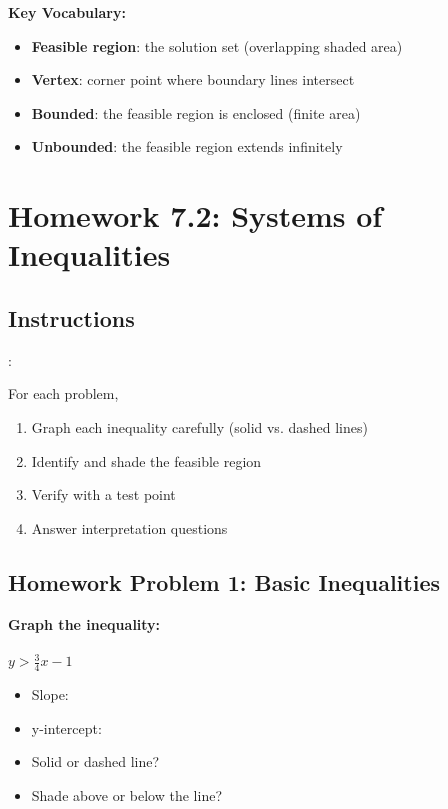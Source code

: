 \documentclass[12pt]{article}
\begin{document}
	        \textbf{Key Vocabulary:}
	        \begin{itemize}
		        \item \textbf{Feasible region}: the solution set (overlapping shaded area)
		        \item \textbf{Vertex}: corner point where boundary lines intersect
		        \item \textbf{Bounded}: the feasible region is enclosed (finite area)
		        \item \textbf{Unbounded}: the feasible region extends infinitely
	        \end{itemize}
	
	        \newpage
	
	\section*{Homework 7.2: Systems of Inequalities}
	
	    \subsection*{Instructions}:
		
	        For each problem,
	        \begin{enumerate}
		        \item Graph each inequality carefully (solid vs. dashed lines)
		        \item Identify and shade the feasible region
		        \item Verify with a test point
		        \item Answer interpretation questions
	        \end{enumerate}
	
	        \newpage
	
	    \subsection*{Homework Problem 1: Basic Inequalities}
		
            \textbf{Graph the inequality:}\\\\
			$y > \frac{3}{4} x - 1$
			\begin{itemize}
				\item Slope: \underline{\hspace{1in}}
				\item y-intercept: \underline{\hspace{1in}}
				\item Solid or dashed line? \underline{\hspace{2in}}
				\item Shade above or below the line? \underline{\hspace{2in}}
			\end{itemize}
				
\end{document}
